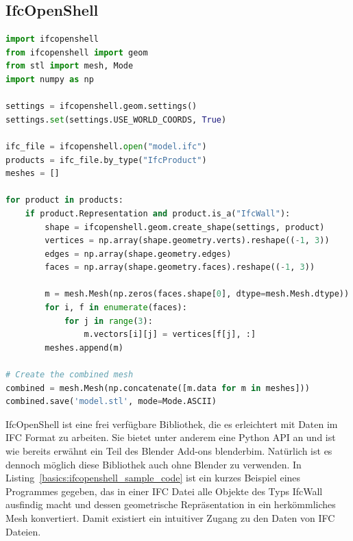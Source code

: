 \subsection{IfcOpenShell}\label{basics:ifcopenshell}
\begin{lstlisting}[label={basics:ifcopenshell_sample_code}, language=Python, caption=Beispielprogramm zur Extraktion bestimmter Daten einer IFC Datei und Generierung eines Meshes aus deren geometrischen Representationen.]
import ifcopenshell
from ifcopenshell import geom
from stl import mesh, Mode
import numpy as np

settings = ifcopenshell.geom.settings()
settings.set(settings.USE_WORLD_COORDS, True)

ifc_file = ifcopenshell.open("model.ifc")
products = ifc_file.by_type("IfcProduct")
meshes = []

for product in products:
    if product.Representation and product.is_a("IfcWall"):
        shape = ifcopenshell.geom.create_shape(settings, product)
        vertices = np.array(shape.geometry.verts).reshape((-1, 3))
        edges = np.array(shape.geometry.edges)
        faces = np.array(shape.geometry.faces).reshape((-1, 3))

        m = mesh.Mesh(np.zeros(faces.shape[0], dtype=mesh.Mesh.dtype))
        for i, f in enumerate(faces):
            for j in range(3):
                m.vectors[i][j] = vertices[f[j], :]
        meshes.append(m)

# Create the combined mesh
combined = mesh.Mesh(np.concatenate([m.data for m in meshes]))
combined.save('model.stl', mode=Mode.ASCII)
\end{lstlisting}

IfcOpenShell ist eine frei verfügbare Bibliothek, die es erleichtert mit Daten im IFC Format zu arbeiten.
Sie bietet unter anderem eine Python API an und ist wie bereits erwähnt ein Teil des Blender Add-ons blenderbim.
Natürlich ist es dennoch möglich diese Bibliothek auch ohne Blender zu verwenden.
In Listing~\ref{basics:ifcopenshell_sample_code} ist ein kurzes Beispiel eines Programmes gegeben, das in einer IFC Datei alle Objekte des Typs IfcWall ausfindig macht und dessen geometrische Repräsentation in ein herkömmliches Mesh konvertiert.
Damit existiert ein intuitiver Zugang zu den Daten von IFC Dateien.

